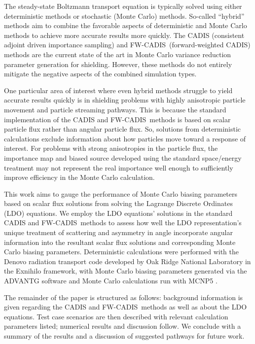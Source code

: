 \documentclass{article} %
\newcommand{\fwc}{\mbox{FW-CADIS}}
\begin{document}
The steady-state Boltzmann transport equation is typically solved using either
deterministic methods or stochastic (Monte Carlo) methods. So-called
``hybrid'' methods aim to combine the favorable aspects of deterministic and
Monte Carlo methods to achieve more accurate results more quickly. The CADIS
(consistent adjoint driven importance sampling) and \fwc\ (forward-weighted
CADIS) methods are the current state of the art in Monte Carlo variance
reduction parameter generation for shielding. However, these methods do not
entirely mitigate the negative aspects of the combined simulation types.

One particular area of interest where even hybrid methods struggle to yield
accurate results quickly is in shielding problems with highly anisotropic
particle movement and particle streaming pathways. This is because the
standard implementation of the CADIS and \fwc\ methods is based on scalar
particle flux rather than angular particle flux. So, solutions from
deterministic calculations exclude information about how particles move toward
a response of interest. For problems with strong anisotropies in the particle
flux, the importance map and biased source  developed using the standard
space/energy treatment may not represent the real importance well enough to
sufficiently improve efficiency in the Monte Carlo calculation.

This work aims to gauge the performance of Monte Carlo biasing parameters
based on scalar flux solutions from solving the Lagrange Discrete Ordinates
(LDO) equations.  We employ the LDO equations' solutions in the standard CADIS
and \fwc\ methods to assess how well the LDO representation's unique treatment
of scattering and asymmetry in angle incorporate angular information into the
resultant scalar flux solutions and corresponding Monte Carlo biasing
parameters. Deterministic calculations were performed with the Denovo
radiation transport code developed by Oak Ridge National Laboratory
\cite{denovo} in the Exnihilo framework, with Monte Carlo biasing parameters
generated via the ADVANTG software \cite{advantg} and Monte Carlo calculations
run with MCNP5 \cite{mcnp}.

The remainder of the paper is structured as follows: background information is
given regarding the CADIS and \fwc\ methods as well as about the LDO
equations. Test case scenarios are then described with relevant calculation
parameters listed; numerical results and discussion follow. We conclude with a
summary of the results and a discussion of suggested pathways for future work.
\end{document}
